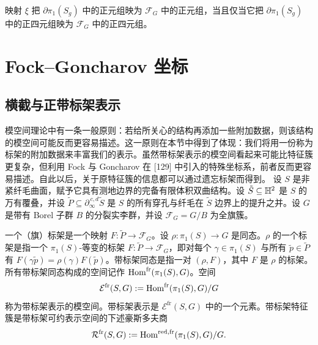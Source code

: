 
\begin{remark}[10.5] 映射 $\xi$ 把 $\partial\pi_1(S_g)$ 中的正元组映为 $\mathcal{F}_G$ 中的正元组，当且仅当它把 $\partial\pi_1(S_g)$ 中的正四元组映为 $\mathcal{F}_G$ 中的正四元组。
\end{remark}

\section{Fock–Goncharov 坐标}

\subsection{横截与正带标架表示}

模空间理论中有一条一般原则：若给所关心的结构再添加一些附加数据，则该结构的模空间可能反而更容易描述。这一原则在本节中得到了体现：我们将用一份称为标架的附加数据来丰富我们的表示。虽然带标架表示的模空间看起来可能比特征簇更复杂，但利用 Fock 与 Goncharov 在 [129] 中引入的特殊坐标系，前者反而更容易描述。自此以后，关于原特征簇的信息都可以通过遗忘标架而得到。
设 $S$ 是非紧纤毛曲面，赋予它具有测地边界的完备有限体积双曲结构。设 $\tilde S\subseteq\mathbb{H}^2$ 是 $S$ 的万有覆叠，并设 $\tilde P\subseteq\partial_\infty^{\,c,d}\tilde S$ 是 $S$ 的所有穿孔与纤毛在 $\tilde S$ 边界上的提升之并。设 $G$ 是带有 Borel 子群 $B$ 的分裂实李群，并设 $\mathcal{F}_G=G/B$ 为全旗簇。

\begin{definition}[10.6] 一个（旗）标架是一个映射 $F:\tilde P\to\mathcal{F}_G$。设 $\rho:\pi_1(S)\to G$ 是同态。$\rho$ 的一个标架是指一个 $\pi_1(S)$-等变的标架 $F:\tilde P\to\mathcal{F}_G$，即对每个 $\gamma\in\pi_1(S)$ 与所有 $\tilde p\in\tilde P$ 有 $F(\gamma\tilde p)=\rho(\gamma)F(\tilde p)$。带标架同态是指一对 $(\rho,F)$，其中 $F$ 是 $\rho$ 的标架。
所有带标架同态构成的空间记作 $\operatorname{Hom}^{\mathrm{fr}}(\pi_1(S),G)$。空间
\[
\mathcal{E}^{\mathrm{fr}}(S,G) := \operatorname{Hom}^{\mathrm{fr}}(\pi_1(S),G)/G
\]
称为带标架表示的模空间。带标架表示是 $\mathcal{E}^{\mathrm{fr}}(S,G)$ 中的一个元素。带标架特征簇是带标架可约表示空间的下述豪斯多夫商
\[
\mathcal{R}^{\mathrm{fr}}(S,G) := \operatorname{Hom}^{\mathrm{red},\mathrm{fr}}(\pi_1(S),G)/G.
\]
\end{definition}

